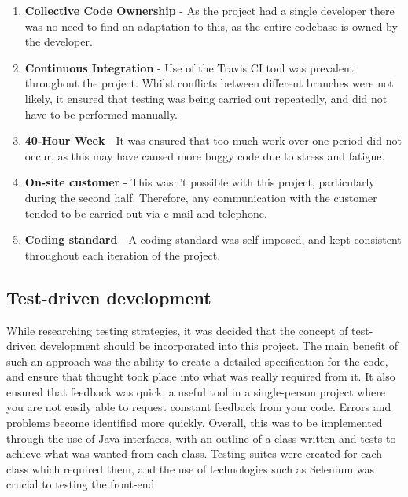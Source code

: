 \begin{enumerate}
\item	\textbf{Collective Code Ownership} - As the project had a single developer there was no need to find an adaptation to this, as the entire codebase is owned by the developer.
\item	\textbf{Continuous Integration} - Use of the Travis CI tool was prevalent throughout the project. Whilst conflicts between different branches were not likely, it ensured that testing was being carried out repeatedly, and did not have to be performed manually\cite{TravisCI}.
\item	\textbf{40-Hour Week} - It was ensured that too much work over one period did not occur, as this may have caused more buggy code due to stress and fatigue.
\item	\textbf{On-site customer} - This wasn't possible with this project, particularly during the second half. Therefore, any communication with the customer tended to be carried out via e-mail and telephone.
\item	\textbf{Coding standard} - A coding standard was self-imposed, and kept consistent throughout each iteration of the project.
\end{enumerate}
\subsection{Test-driven development}

While researching testing strategies, it was decided that the concept of test-driven development should be incorporated into this project. The main benefit of such an approach was the ability to create a detailed specification for the code, and ensure that thought took place into what was really required from it. It also ensured that feedback was quick, a useful tool in a single-person project where you are not easily able to request constant feedback from your code. Errors and problems become identified more quickly. Overall, this was to be implemented through the use of Java interfaces, with an outline of a class written and tests to achieve what was wanted from each class. Testing suites were created for each class which required them, and the use of technologies such as Selenium was crucial to testing the front-end.

